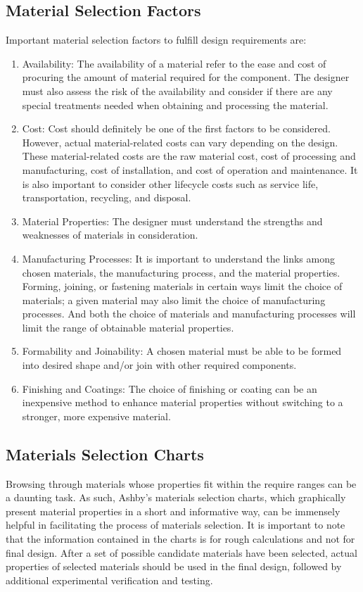 \documentclass[
10pt,
a4paper,
openany,
svgnames,
]{book}
\begin{document}
\subsection{Material Selection Factors}

Important material selection factors to fulfill design requirements are:
\begin{enumerate}
\item Availability: The availability of a material refer to the ease and cost of procuring the amount of material required for the component. The designer must also assess the risk of the availability and consider if there are any special treatments needed when obtaining and processing the material.
\item Cost: Cost should definitely be one of the first factors to be considered. However, actual material-related costs can vary depending on the design. These material-related costs are the raw material cost, cost of processing and manufacturing, cost of installation, and cost of operation and maintenance. It is also important to consider other lifecycle costs such as service life, transportation, recycling, and disposal.
\item Material Properties: The designer must understand the strengths and weaknesses of materials in consideration.
\item Manufacturing Processes: It is important to understand the links among chosen materials, the manufacturing process, and the material properties. Forming, joining, or fastening materials in certain ways limit the choice of materials; a given material may also limit the choice of manufacturing processes. And both the choice of materials and manufacturing processes will limit the range of obtainable material properties.
\item Formability and Joinability: A chosen material must be able to be formed into desired shape and/or join with other required components.
\item Finishing and Coatings: The choice of finishing or coating can be an inexpensive method to enhance material properties without switching to a stronger, more expensive material.
\end{enumerate}

\subsection{Materials Selection Charts}

Browsing through materials whose properties fit within the require ranges can be a daunting task. As such, Ashby’s materials selection charts, which graphically present material properties in a short and informative way, can be immensely helpful in facilitating the process of materials selection. It is important to note that the information contained in the charts is for rough calculations and not for final design. After a set of possible candidate materials have been selected, actual properties of selected materials should be used in the final design, followed by additional experimental verification and testing.
\end{document}
